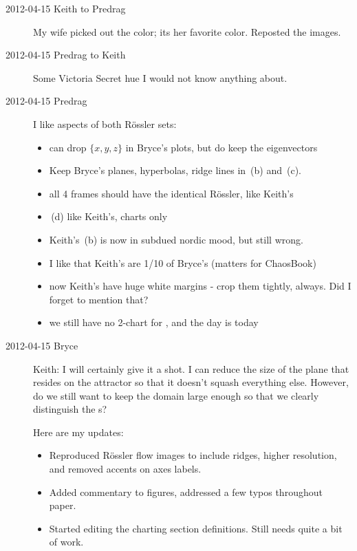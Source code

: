 \begin{description}
\item[2012-04-15 Keith to Predrag] My wife picked out the color; its her
favorite color.  Reposted the images.

\item[2012-04-15 Predrag to Keith]
Some Victoria Secret hue I would not know anything about.

\item[2012-04-15 Predrag] I like aspects of both R\"ossler sets:

\begin{itemize}
  \item can drop $\{x,y,z\}$ in Bryce's plots, but do keep the eigenvectors
  \item Keep Bryce's planes, hyperbolas, ridge lines in
        \,(b) and \,(c).
  \item all 4 frames should have the identical R\"ossler, like Keith's
  \item {}\,(d) like Keith's, charts only
  \item Keith's \,(b) is now in subdued nordic mood, but still
        wrong.
  \item I like that Keith's are 1/10 of Bryce's (matters for ChaosBook)
  \item now Keith's have huge white margins - crop them tightly, always.
        Did I forget to mention that?
  \item we still have no 2-chart for \cLe, and the day is today
\end{itemize}

\item[2012-04-15 Bryce]

Keith: I will certainly give it a shot. I can reduce the size of the
plane that resides on the attractor so that it doesn't squash everything
else. However, do we still want to keep the domain large enough so that
we clearly distinguish the \poincBord s?

Here are my updates:
  	\begin{itemize}
  	\item Reproduced R\"ossler flow images to include ridges, higher
          resolution, and removed accents on axes labels.
  	\item Added commentary to figures, addressed a few typos throughout paper.
  	\item Started editing the charting section definitions. Still needs quite a bit of work.
  	\end{itemize}


\end{description}
